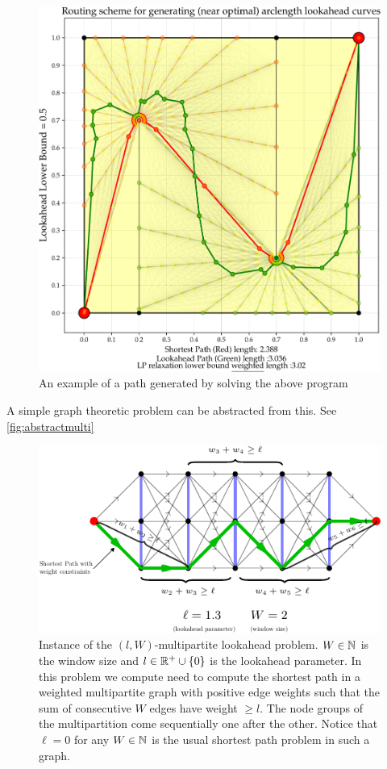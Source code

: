 \begin{figure}[H]
\centering
\begin{minipage}[t]{0.5\textwidth}
\includegraphics[width=\textwidth]{miscimages/lookex-double.pdf}
\end{minipage}
\caption{An example of a path generated by solving the above program}
\label{fig:codex2}
\end{figure}


A simple graph theoretic problem can be abstracted from this. See 
\autoref{fig:abstractmulti} 


\begin{figure}[H]
\centering
\includegraphics[width=14cm]{asy2d/multipartite-abstraction.pdf}
\caption{Instance of the $(l,W)$-multipartite lookahead problem. $W\in \mathbb{N}$ is the window size and $l\in\mathbb{R}^{+} \cup \{0\}$ is the 
lookahead parameter. In this problem we compute need to compute the shortest path in a weighted multipartite graph with positive edge 
weights such that the sum of consecutive $W$ edges have weight $\geq l$. The node groups of the multipartition come sequentially one 
after the other. Notice that $\ell =0$ for any $W \in \mathbb{N}$ is the usual shortest path problem in such a graph.}

\label{fig:abstractmulti}
\end{figure}


\nwenddocs{}


